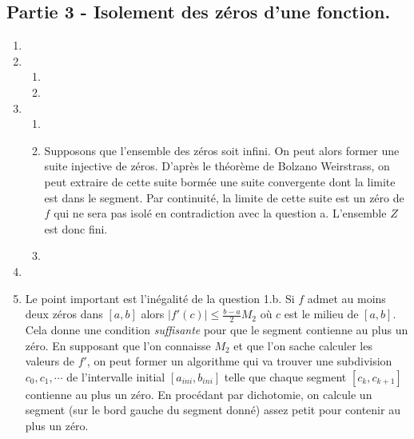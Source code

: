 \subsection*{Partie 3 - Isolement des zéros d'une fonction.}
\begin{enumerate}
  \item 
  \item 
\begin{enumerate}
  \item 
  \item
\end{enumerate}

  \item
\begin{enumerate}
  \item 
  \item Supposons que l'ensemble des zéros soit infini. On peut alors former une suite injective de zéros. D'après le théorème de Bolzano Weirstrass, on peut extraire de cette suite bormée une suite convergente dont la limite est dans le segment. Par continuité, la limite de cette suite est un zéro de $f$ qui ne sera pas isolé en contradiction avec la question a. L'ensemble $Z$ est donc fini.
  \item 
\end{enumerate}

  \item 
  \item Le point important est l'inégalité de la question 1.b. Si $f$ admet au moins deux zéros dans $[a,b]$ alors $|f'(c)|\leq \frac{b-a}{2}M_2$ où $c$ est le milieu de $[a,b]$. Cela donne une condition \emph{suffisante} pour que le segment contienne au plus un zéro. En supposant que l'on connaisse $M_2$ et que l'on sache calculer les valeurs de $f'$, on peut former un algorithme qui va trouver une subdivision $c_0,c_1,\cdots$ de l'intervalle initial $[a_{ini},b_{ini}]$ telle que chaque segment $[c_k,c_{k+1}]$ contienne au plus un zéro.\newline
  En procédant par dichotomie, on calcule un segment (sur le bord gauche du segment donné) assez petit pour contenir au plus un zéro.
  

\end{enumerate}
